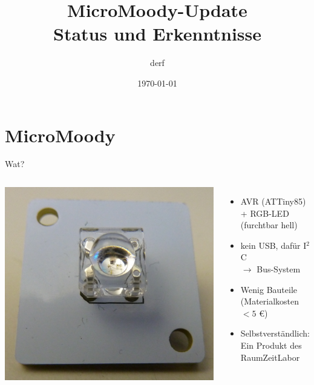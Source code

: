\documentclass[compress]{beamer}
\title[MicroMoody]
	{MicroMoody-Update\\\small Status und Erkenntnisse}
\author{derf}
\institute{Chaosdorf}
\date{\today}
\begin{document}
\begin{frame}
	\titlepage
\end{frame}

\section{MicroMoody}
\begin{frame}{Wat?}
\begin{columns}
\includegraphics[width=\textwidth]{micromoody_front.jpg}
\begin{itemize}
\item AVR (ATTiny85) + RGB-LED\\
(furchtbar hell)
\item kein USB, dafür I$^2$C\\
$\to$ Bus-System
\item Wenig Bauteile\\
(Materialkosten $< 5$ \euro)
\item Selbstverständlich:\\
Ein Produkt des RaumZeitLabor
\end{itemize}
\end{columns}
\end{frame}
\end{document}
